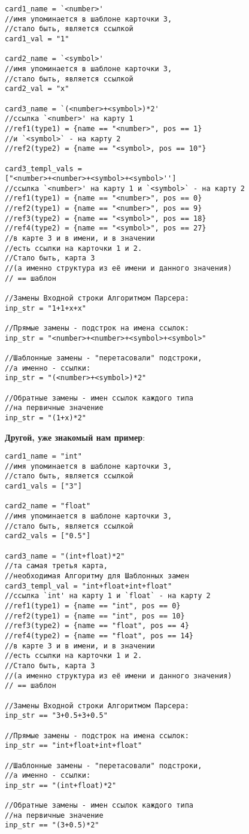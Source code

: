 \documentclass{book}
\begin{document}
\begin{verbatim}
card1_name = `<number>' 
//имя упоминается в шаблоне карточки 3, 
//стало быть, является ссылкой
card1_val = "1"

card2_name = `<symbol>' 
//имя упоминается в шаблоне карточки 3, 
//стало быть, является ссылкой
card2_val = "x"

card3_name = `(<number>+<symbol>)*2' 
//ссылка `<number>' на карту 1 
//ref1(type1) = {name == "<number>", pos == 1}
//и `<symbol>` - на карту 2
//ref2(type2) = {name == "<symbol>, pos == 10"}

card3_templ_vals = 
["<number>+<number>+<symbol>+<symbol>''] 
//ссылка `<number>' на карту 1 и `<symbol>` - на карту 2
//ref1(type1) = {name == "<number>", pos == 0}
//ref2(type1) = {name == "<number>", pos == 9}
//ref3(type2) = {name == "<symbol>", pos == 18}
//ref4(type2) = {name == "<symbol>", pos == 27}
//в карте 3 и в имени, и в значении 
//есть ссылки на карточки 1 и 2. 
//Стало быть, карта 3 
//(а именно структура из её имени и данного значения)
// == шаблон

//Замены Входной строки Алгоритмом Парсера:
inp_str = "1+1+x+x"

//Прямые замены - подстрок на имена ссылок:
inp_str = "<number>+<number>+<symbol>+<symbol>"

//Шаблонные замены - "перетасовали" подстроки, 
//а именно - ссылки:
inp_str = "(<number>+<symbol>)*2"

//Обратные замены - имен ссылок каждого типа
//на первичные значение
inp_str = "(1+x)*2"
\end{verbatim}

\textbf{Другой, уже знакомый нам пример}:

\begin{verbatim}
card1_name = "int"
//имя упоминается в шаблоне карточки 3, 
//стало быть, является ссылкой
card1_vals = ["3"]

card2_name = "float"
//имя упоминается в шаблоне карточки 3, 
//стало быть, является ссылкой
card2_vals = ["0.5"]

card3_name = "(int+float)*2"
//та самая третья карта, 
//необходимая Алгоритму для Шаблонных замен
card3_templ_val = "int+float+int+float"
//ссылка `int' на карту 1 и `float` - на карту 2
//ref1(type1) = {name == "int", pos == 0}
//ref2(type1) = {name == "int", pos == 10}
//ref3(type2) = {name == "float", pos == 4}
//ref4(type2) = {name == "float", pos == 14}
//в карте 3 и в имени, и в значении 
//есть ссылки на карточки 1 и 2. 
//Стало быть, карта 3 
//(а именно структура из её имени и данного значения)
// == шаблон

//Замены Входной строки Алгоритмом Парсера:
inp_str == "3+0.5+3+0.5"

//Прямые замены - подстрок на имена ссылок:
inp_str == "int+float+int+float"

//Шаблонные замены - "перетасовали" подстроки, 
//а именно - ссылки:
inp_str == "(int+float)*2"

//Обратные замены - имен ссылок каждого типа
//на первичные значение
inp_str == "(3+0.5)*2"
\end{verbatim}
\end{document}
